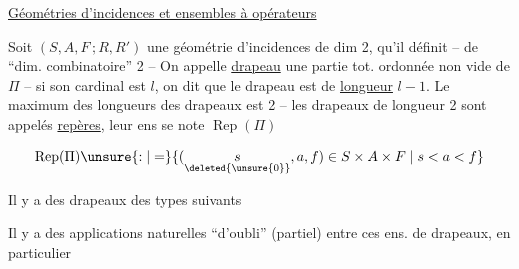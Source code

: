 
\uline{Géométries d'incidences et ensembles à opérateurs}

Soit \inserted{$\Pi=$} $(S,A,F\,;R,R')$  une géométrie d'incidences de dim 2,   qu'il définit -- de ``dim. combinatoire'' 2 -- On appelle \uline{drapeau}  une partie tot. ordonnée non vide de $\Pi$ -- si son cardinal est $l$, on dit que le drapeau est de \uline{longueur} $l-1$. Le maximum des longueurs des drapeaux est 2 -- les drapeaux de longueur 2 sont appelés \uline{repères}, leur ens se note $\operatorname{Rep}(\Pi)$

\[
 \operatorname{Rep}(\Pi)\unsure{:|=}\{(\underset{\deleted{\unsure{0}}}{s},a,f)\in S\times A\times F\mid s<a<f\}
\]

Il y a des drapeaux des types suivants




Il y a des applications naturelles ``d'oubli'' (partiel) entre ces ens. de drapeaux, en particulier


